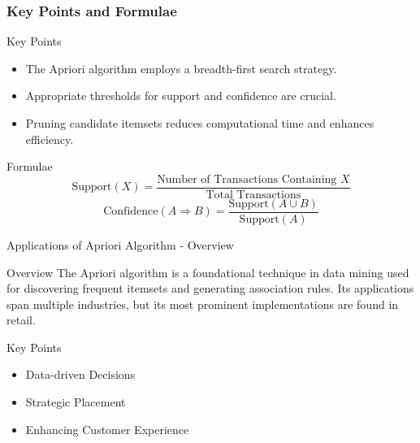 \documentclass[aspectratio=169]{beamer}
\begin{document}
\begin{frame}[fragile]
    \frametitle{Key Points and Formulae}
    \begin{block}{Key Points}
        \begin{itemize}
            \item The Apriori algorithm employs a breadth-first search strategy.
            \item Appropriate thresholds for support and confidence are crucial.
            \item Pruning candidate itemsets reduces computational time and enhances efficiency.
        \end{itemize}
    \end{block}

    \begin{block}{Formulae}
        \begin{equation}
        \text{Support}(X) = \frac{\text{Number of Transactions Containing } X}{\text{Total Transactions}}
        \end{equation}
        \begin{equation}
        \text{Confidence}(A \Rightarrow B) = \frac{\text{Support}(A \cup B)}{\text{Support}(A)}
        \end{equation}
    \end{block}
\end{frame}

\begin{frame}[fragile]{Applications of Apriori Algorithm - Overview}
  \begin{block}{Overview}
    The Apriori algorithm is a foundational technique in data mining used for discovering frequent itemsets and generating association rules. Its applications span multiple industries, but its most prominent implementations are found in retail.
  \end{block}
  \begin{block}{Key Points}
    \begin{itemize}
      \item Data-driven Decisions
      \item Strategic Placement
      \item Enhancing Customer Experience
    \end{itemize}
  \end{block}
\end{frame}
\end{document}
